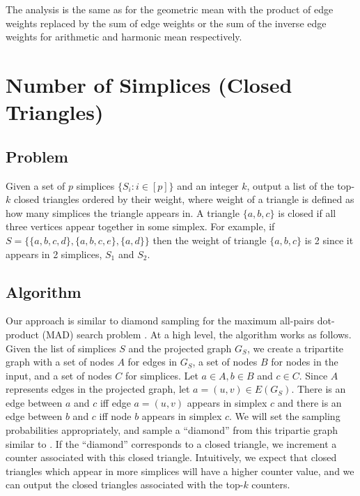 \documentclass{article}
\begin{document}
The analysis is the same as for the geometric mean with the
product of edge weights replaced by the sum of edge weights
or the sum of the inverse edge weights for arithmetic and
harmonic mean respectively.


\section{Number of Simplices (Closed Triangles)}
\label{sec:number_closed}

\subsection{Problem}
Given a set of $p$ simplices $\{S_i : i \in [p]\}$ and
an integer $k$, output a list of the top-$k$ closed 
triangles ordered by their weight, where weight of a 
triangle is defined as how many simplices the triangle 
appears in.
A triangle $\{a,b,c\}$ is closed if all three vertices
appear together in some simplex.
For example, if $S = \{\{a,b,c,d\}, \{a,b,c,e\}, 
\{a,d\} \}$ then the weight of triangle $\{a,b,c\}$ is
2 since it appears in 2 simplices, $S_1$ and $S_2$.


\subsection{Algorithm}

Our approach is similar to diamond sampling for
the maximum all-pairs dot-product (MAD) search 
problem \cite{diamond}.
At a high level, the algorithm works as follows. Given the list
of simplices $S$ and the projected graph $G_S$, we create a
tripartite graph with a set of nodes $A$ for edges in $G_S$,
a set of nodes $B$ for nodes in the input, and 
a set of nodes $C$ for simplices.
Let $a \in A, b \in B$ and $c \in C$. Since $A$
represents edges in the projected graph, let $a = (u,v)
\in E(G_S)$. There is an edge between $a$ and $c$ iff
edge $a = (u,v)$ appears in simplex $c$ and there is an
edge between $b$ and $c$ iff node $b$ appears in simplex
$c$. We will set the sampling probabilities appropriately,
and sample a ``diamond'' from this tripartie graph similar to
\cite{diamond}.  
If the ``diamond'' corresponds to a closed triangle,
we increment a counter associated with this closed triangle.
Intuitively, we expect that closed triangles which appear in 
more simplices will have a higher counter value, and we can
output the closed triangles associated with the top-$k$
counters. 
\end{document}
